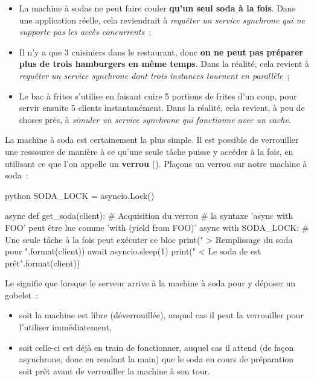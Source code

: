 \documentclass[small]{zmdocument}
\begin{document}
\begin{itemize}
\item\relax La machine à sodas ne peut faire couler \textbf{qu’un seul soda à la fois}. Dans
une application réelle, cela reviendrait à \textit{requêter un service synchrone
qui ne supporte pas les accès concurrents} ;
\item\relax Il n’y a que 3 cuisiniers dans le restaurant, donc \textbf{on ne peut pas préparer
plus de trois hamburgers en même temps}. Dans la réalité, cela revient à
\textit{requêter un service synchrone dont trois instances tournent en parallèle} ;
\item\relax Le bac à frites s’utilise en faisant cuire 5 portions de frites d’un coup,
pour servir ensuite 5 clients instantanément. Dans la réalité, cela revient,
à peu de choses près, à \textit{simuler un service synchrone qui fonctionne avec un
cache}.
\end{itemize}


La machine à soda est certainement la plus simple. Il est possible de
verrouiller une ressource de manière à ce qu’une seule tâche puisse y accéder à
la fois, en utilisant ce que l’on appelle un \textbf{verrou} ().
Plaçons un verrou sur notre machine à soda :



\begin{CodeBlock}{python}
SODA_LOCK = asyncio.Lock()

async def get_soda(client):
    # Acquisition du verrou
    # la syntaxe 'async with FOO' peut être lue comme 'with (yield from FOO)'
    async with SODA_LOCK:
        # Une seule tâche à la fois peut exécuter ce bloc
        print("    > Remplissage du soda pour {}".format(client))
        await asyncio.sleep(1)
        print("    < Le soda de {} est prêt".format(client))
\end{CodeBlock}



Le  signifie que lorsque le serveur arrive à la
machine à soda pour y déposer un gobelet :



\begin{itemize}
\item\relax soit la machine est libre (déverrouillée), auquel cas il peut la verrouiller
pour l’utiliser immédiatement,
\item\relax soit celle-ci est déjà en train de fonctionner, auquel cas il attend (de façon asynchrone, donc en rendant la main) que le
soda en cours de préparation soit prêt avant de verrouiller la machine à son
tour.
\end{itemize}
\end{document}
